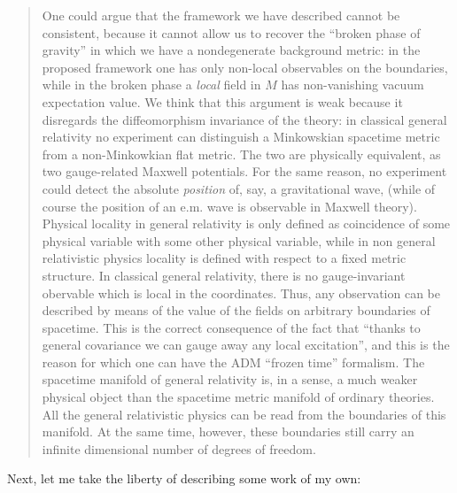 \documentclass[12pt]{article}
\def\tightlist{}
\renewcommand{\texttt}[1]{%
  \begingroup
  \ttfamily
  \begingroup\lccode`~=`/\lowercase{\endgroup\def~}{/\discretionary{}{}{}}%
  \begingroup\lccode`~=`[\lowercase{\endgroup\def~}{[\discretionary{}{}{}}%
  \begingroup\lccode`~=`.\lowercase{\endgroup\def~}{.\discretionary{}{}{}}%
  \catcode`/=\active\catcode`[=\active\catcode`.=\active
  \scantokens{#1\noexpand}%
  \endgroup
}
\begin{document}
\begin{quote}
One could argue that the framework we have described cannot be
consistent, because it cannot allow us to recover the ``broken phase of
gravity'' in which we have a nondegenerate background metric: in the
proposed framework one has only non-local observables on the boundaries,
while in the broken phase a \emph{local} field in \(M\) has
non-vanishing vacuum expectation value. We think that this argument is
weak because it disregards the diffeomorphism invariance of the theory:
in classical general relativity no experiment can distinguish a
Minkowskian spacetime metric from a non-Minkowkian flat metric. The two
are physically equivalent, as two gauge-related Maxwell potentials. For
the same reason, no experiment could detect the absolute \emph{position}
of, say, a gravitational wave, (while of course the position of an e.m.
wave is observable in Maxwell theory). Physical locality in general
relativity is only defined as coincidence of some physical variable with
some other physical variable, while in non general relativistic physics
locality is defined with respect to a fixed metric structure. In
classical general relativity, there is no gauge-invariant obervable
which is local in the coordinates. Thus, any observation can be
described by means of the value of the fields on arbitrary boundaries of
spacetime. This is the correct consequence of the fact that ``thanks to
general covariance we can gauge away any local excitation'', and this is
the reason for which one can have the ADM ``frozen time'' formalism. The
spacetime manifold of general relativity is, in a sense, a much weaker
physical object than the spacetime metric manifold of ordinary theories.
All the general relativistic physics can be read from the boundaries of
this manifold. At the same time, however, these boundaries still carry
an infinite dimensional number of degrees of freedom.
\end{quote}

Next, let me take the liberty of describing some work of my own:

\end{document}
